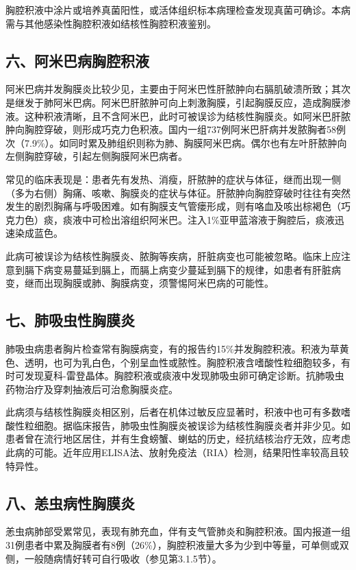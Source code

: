 胸腔积液中涂片或培养真菌阳性，或活体组织标本病理检查发现真菌可确诊。本病需与其他感染性胸腔积液如结核性胸腔积液鉴别。

\subsection{六、阿米巴病胸腔积液}

阿米巴病并发胸膜炎比较少见，主要由于阿米巴性肝脓肿向右膈肌破溃所致；其次是继发于肺阿米巴病。阿米巴肝脓肿可向上刺激胸膜，引起胸膜反应，造成胸膜渗液。这种积液清晰，且不含阿米巴，此时可被误诊为结核性胸膜炎。如阿米巴肝脓肿向胸腔穿破，则形成巧克力色积液。国内一组737例阿米巴肝病并发脓胸者58例次（7.9\%）。如同时累及肺组织则称为肺、胸膜阿米巴病。偶尔也有左叶肝脓肿向左侧胸腔穿破，引起左侧胸膜阿米巴病者。

常见的临床表现是：患者先有发热、消瘦，肝脓肿的症状与体征，继而出现一侧（多为右侧）胸痛、咳嗽、胸膜炎的症状与体征。肝脓肿向胸腔穿破时往往有突然发生的剧烈胸痛与呼吸困难。如有胸膜支气管瘘形成，则有咯血及咳出棕褐色（巧克力色）痰，痰液中可检出溶组织阿米巴。注入1\%亚甲蓝溶液于胸腔后，痰液迅速染成蓝色。

此病可被误诊为结核性胸膜炎、脓胸等疾病，肝脏病变也可能被忽略。临床上应注意到膈下病变易蔓延到膈上，而膈上病变少蔓延到膈下的规律，如患者有肝脏病变，继而出现胸膜或肺、胸膜病变，须警惕阿米巴病的可能性。

\subsection{七、肺吸虫性胸膜炎}

肺吸虫病患者胸片检查常有胸膜病变，有的报告约15\%并发胸腔积液。积液为草黄色、透明，也可为乳白色，个别呈血性或脓性。胸腔积液含嗜酸性粒细胞较多，有时可发现夏科-雷登晶体。胸腔积液或痰液中发现肺吸虫卵可确定诊断。抗肺吸虫药物治疗及穿刺抽液后可治愈胸膜炎症。

此病须与结核性胸膜炎相区别，后者在机体过敏反应显著时，积液中也可有多数嗜酸性粒细胞。据临床报告，肺吸虫性胸膜炎被误诊为结核性胸膜炎者并非少见。如患者曾在流行地区居住，并有生食螃蟹、蝲蛄的历史，经抗结核治疗无效，应考虑此病的可能。近年应用ELISA法、放射免疫法（RIA）检测，结果阳性率较高且较特异性。

\subsection{八、恙虫病性胸膜炎}

恙虫病肺部受累常见，表现有肺充血，伴有支气管肺炎和胸腔积液。国内报道一组31例患者中累及胸膜者有8例（26\%），胸腔积液量大多为少到中等量，可单侧或双侧，一般随病情好转可自行吸收（参见第3.1.5节）。

